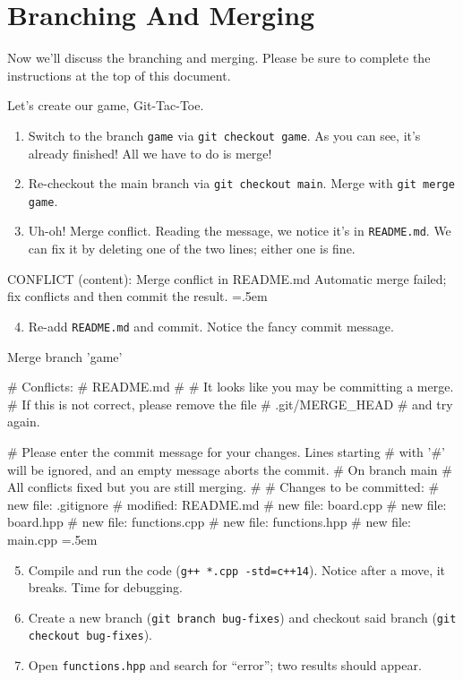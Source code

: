 \documentclass[12pt]{article}
\newenvironment{lcverbatim}
 {\SaveVerbatim{cverb}}
 {\endSaveVerbatim
  \flushleft\fboxrule=0pt\fboxsep=.5em
  \scriptsize
  \colorbox{cverbbg}{%
    \makebox[\dimexpr\linewidth-2\fboxsep][l]{\BUseVerbatim{cverb}}%
  }
  \endflushleft
}
\newcommand{\shellcmd}[1]{\texttt{\colorbox{gray!30}{#1}}}
\begin{document}
\section{Branching And Merging}
Now we'll discuss the branching and merging. Please be sure to complete the instructions at the top of this document.

Let's create our game, Git-Tac-Toe.

\begin{enumerate}
    \item Switch to the branch \texttt{game} via \shellcmd{git checkout game}. As you can see, it's already finished! All we have to do is merge!
    \item Re-checkout the main branch via \shellcmd{git checkout main}. Merge with \shellcmd{git merge game}.
    \item Uh-oh! Merge conflict. Reading the message, we notice it's in \texttt{README.md}. We can fix it by deleting one of the two lines; either one is fine.
\end{enumerate}

\begin{lcverbatim}
CONFLICT (content): Merge conflict in README.md
Automatic merge failed; fix conflicts and then commit the result.
\end{lcverbatim}

\begin{enumerate}
    \setcounter{enumi}{3}
    \item Re-add \texttt{README.md} and commit. Notice the fancy commit message.
\end{enumerate}

\begin{lcverbatim}
Merge branch 'game'

# Conflicts:
#       README.md
#
# It looks like you may be committing a merge.
# If this is not correct, please remove the file
#       .git/MERGE_HEAD
# and try again.


# Please enter the commit message for your changes. Lines starting
# with '#' will be ignored, and an empty message aborts the commit.
# On branch main
# All conflicts fixed but you are still merging.
#
# Changes to be committed:
#       new file:   .gitignore
#       modified:   README.md
#       new file:   board.cpp
#       new file:   board.hpp
#       new file:   functions.cpp
#       new file:   functions.hpp
#       new file:   main.cpp
\end{lcverbatim}

\begin{enumerate}
    \setcounter{enumi}{4}
    \item Compile and run the code (\shellcmd{g++ *.cpp -std=c++14}). Notice after a move, it breaks. Time for debugging.
    \item Create a new branch (\shellcmd{git branch bug-fixes}) and checkout said branch (\shellcmd{git checkout bug-fixes}).
    \item Open \texttt{functions.hpp} and search for ``error''; two results should appear.
\end{enumerate}
\end{document}

